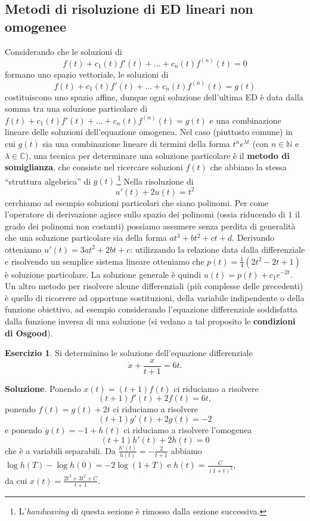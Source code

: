 \documentclass[a4paper,twoside]{article}
\newcommand{\N}{\mathbb{N}}
\newcommand{\C}{\mathbb{C}}
\theoremstyle{definition}
\newtheorem{ex}[theorem]{Esercizio}
\numberwithin{theorem}{section}
\begin{document}
\subsection{Metodi di risoluzione di ED lineari non omogenee}

Considerando che le soluzioni di 
$$ f(t) + c_1(t) f'(t) + \ldots + c_n(t) f^{(n)}(t) = 0 $$
formano uno spazio vettoriale, le soluzioni di 
$$ f(t) + c_1(t) f'(t) + \ldots + c_n(t) f^{(n)}(t) = g(t) $$
costituiscono uno spazio affine, dunque ogni soluzione dell'ultima ED è data dalla somma tra una soluzione particolare di $ f(t) + c_1(t) f'(t) + \ldots + c_n(t) f^{(n)}(t) = g(t) $ e una combinazione lineare delle soluzioni dell'equazione omogenea. Nel caso (piuttosto comune) in cui $g(t)$ sia una combinazione lineare di termini della forma $t^n e^{\lambda t}$ (con $n\in\N$ e $\lambda\in\C$), una tecnica per determinare una soluzione particolare è il \textbf{metodo di somiglianza}, che consiste nel ricercare soluzioni $f(t)$ che abbiano la stessa ``struttura algebrica'' di $g(t)$.\footnote{L'\emph{handwaving} di questa sezione è rimosso dalla sezione successiva.} Nella risoluzione di  
$$ u'(t)+2u(t) = t^2$$
cerchiamo ad esempio soluzioni particolari che siano polinomi. Per come l'operatore di derivazione agisce sullo spazio dei polinomi (ossia riducendo di $1$ il grado dei polinomi non costanti) possiamo assumere senza perdita di generalità che una soluzione particolare sia della forma $at^3+bt^2+ct+d$.  Derivando otteniamo $u'(t)=3at^2+2bt+c$: utilizzando la relazione data dalla differenziale e risolvendo un semplice sistema lineare otteniamo che $p(t)=\frac{1}{4}(2t^2-2t+1)$ è soluzione particolare.
La soluzione generale è quindi $u(t)= p(t) + c_1 e^{-2t}$.\\
Un altro metodo per risolvere alcune differenziali (più complesse delle precedenti) 
è quello di ricorrere ad opportune sostituzioni, della variabile indipendente o della funzione obiettivo, ad esempio considerando l'equazione differenziale soddisfatta dalla funzione inversa di una soluzione (si vedano a tal proposito le \textbf{condizioni di Osgood}).\\

\begin{ex} Si determinino le soluzione dell'equazione differenziale 
$$ \dot{x}+\frac{x}{t+1} = 6t. $$
\end{ex}
\textbf{Soluzione}. Ponendo $x(t)=(t+1)f(t)$ ci riduciamo a risolvere 
$$ (t+1)f'(t) + 2f(t) = 6t, $$
ponendo $f(t)=g(t)+2t$ ci riduciamo a risolvere 
$$ (t+1) g'(t) + 2g(t)  = -2 $$
e ponendo $g(t)=-1+h(t)$ ci riduciamo a risolvere l'omogenea
$$ (t+1)h'(t)+2h(t) = 0 $$
che è a variabili separabili. Da $\frac{h'(t)}{h(t)}=-\frac{2}{t+1}$ abbiamo $\log h(T)-\log h(0)=-2\log(1+T)$ e $h(t)=\frac{C}{(1+t)^2}$,\\ da cui $x(t)=\frac{2t^3+3t^2+C}{t+1}$.\\
\end{document}
